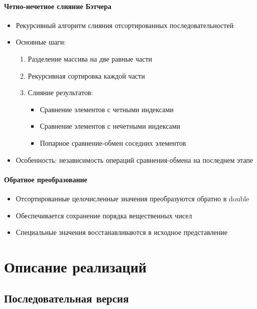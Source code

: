 \documentclass[12pt]{article}
\begin{document}
\paragraph{Четно-нечетное слияние Бэтчера}
\begin{itemize}
    \item Рекурсивный алгоритм слияния отсортированных последовательностей
    \item Основные шаги:
    \begin{enumerate}
        \item Разделение массива на две равные части
        \item Рекурсивная сортировка каждой части
        \item Слияние результатов:
        \begin{itemize}
            \item Сравнение элементов с четными индексами
            \item Сравнение элементов с нечетными индексами
            \item Попарное сравнение-обмен соседних элементов
        \end{itemize}
    \end{enumerate}
    \item Особенность: независимость операций сравнения-обмена на последнем этапе
\end{itemize}

\paragraph{Обратное преобразование}
\begin{itemize}
    \item Отсортированные целочисленные значения преобразуются обратно в double
    \item Обеспечивается сохранение порядка вещественных чисел
    \item Специальные значения восстанавливаются в исходное представление
\end{itemize}

\newpage

\section{Описание реализаций}
\subsection{Последовательная версия}
\end{document}
